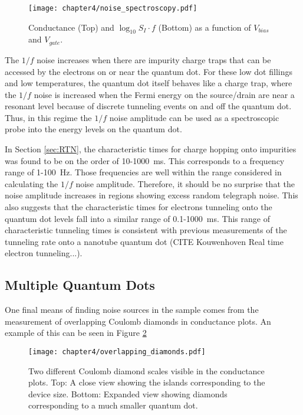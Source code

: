 \begin{figure}
    \centering
    \texttt{[image: chapter4/noise\_spectroscopy.pdf]}
    \caption{Conductance (Top) and $\log_{10}{S_I \cdot f}$ (Bottom) as a function of $V_{bias}$ and $V_{gate}$.}
    \label{fig:noise_spectroscopy}
\end{figure}

The $1/f$ noise increases when there are impurity charge traps that can be accessed by the electrons on or near the quantum dot. For these low dot fillings and low temperatures, the quantum dot itself behaves like a charge trap, where the $1/f$ noise is increased when the Fermi energy on the source/drain are near a resonant level because of discrete tunneling events on and off the quantum dot. Thus, in this regime the $1/f$ noise amplitude can be used as a spectroscopic probe into the energy levels on the quantum dot.

In Section \ref{sec:RTN}, the characteristic times for charge hopping onto impurities was found to be on the order of 10-\SI{1000}{\milli\second}. This corresponds to a frequency range of 1-\SI{100}{\hertz}. Those frequencies are well within the range considered in calculating the $1/f$ noise amplitude. Therefore, it should be no surprise that the noise amplitude increases in regions showing excess random telegraph noise. This also suggests that the characteristic times for electrons tunneling onto the quantum dot levels fall into a similar range of 0.1-\SI{1000}{\milli\second}. This range of characteristic tunneling times is consistent with previous measurements of the tunneling rate onto a nanotube quantum dot (CITE Kouwenhoven Real time electron tunneling...).

\subsection{Multiple Quantum Dots}

One final means of finding noise sources in the sample comes from the measurement of overlapping Coulomb diamonds in conductance plots. An example of this can be seen in Figure \ref{fig:overlapping_diamonds}

\begin{figure}
    \centering
    \texttt{[image: chapter4/overlapping\_diamonds.pdf]}
    \caption{Two different Coulomb diamond scales visible in the conductance plots. Top: A close view showing the islands corresponding to the device size. Bottom: Expanded view showing diamonds corresponding to a much smaller quantum dot.}
    \label{fig:overlapping_diamonds}
\end{figure}

